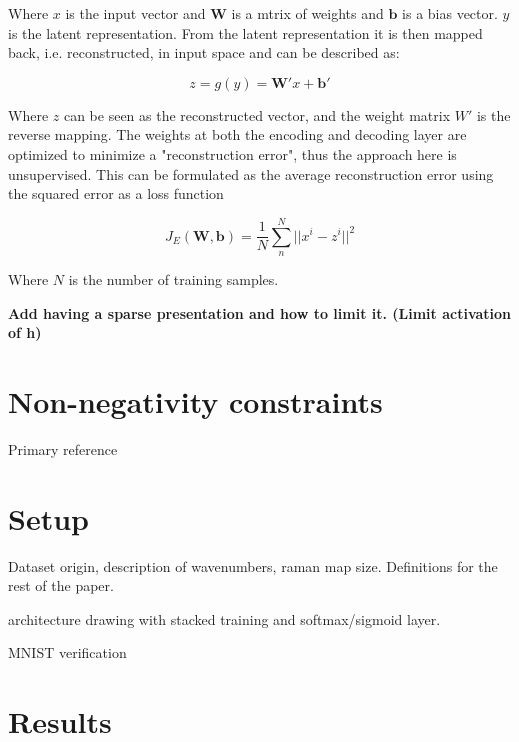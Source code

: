 \documentclass{article}
\begin{document}
Where $x$ is the input vector and $\mathbf{W}$ is a mtrix of weights and $\mathbf{b}$ is a bias vector. $y$ is the latent representation. From the latent representation it is then mapped back, i.e. reconstructed, in input space and can be described as:

\begin{equation}
z = g(y) = \mathbf{W'}x + \mathbf{b'}
\end{equation}

Where $z$ can be seen as the reconstructed vector, and the weight matrix $W'$ is the reverse mapping. The weights at both the encoding and decoding layer are optimized to minimize a "reconstruction error", thus the approach here is unsupervised. This can be formulated as the average reconstruction error using the squared error as a loss function

\begin{equation}
J_E(\mathbf{W},\mathbf{b}) = \frac{1}{N} \sum_n^N || x^i - z^i || ^2
\end{equation}

Where $N$ is the number of training samples. 

\textbf{Add having a sparse presentation and how to limit it. (Limit activation of h)}

\section{Non-negativity constraints}
\label{sec:prior}

%



Primary reference \cite{Hosseini-Asl2016}

\section{Setup}
\label{sec:setup}


Dataset origin, description of wavenumbers, raman map size. Definitions for the rest of the paper.

architecture drawing with stacked training and softmax/sigmoid layer.

MNIST verification

\section{Results}
\label{sec:results}
\end{document}
